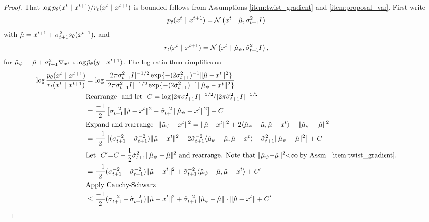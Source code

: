 \begin{proof}
That $\log p_{\theta}(x^{t}~\vert~ x^{t+1})/r_t(x^{t} ~\vert~ x^{t+1})$ is bounded follows from Assumptions \ref{item:twist_gradient} and \ref{item:proposal_var}.
First write
$$
p_{\theta}(x^{t} ~\vert~ x^{t+1}) = \mathcal{N}\left(x^{t} ~\vert~ \hat \mu, \sigma_{t+1}^2 I
\right)$$
with $\hat \mu=x^{t+1} + \sigma_{t+1}^2 s_\theta(x^{t+1}),$
and 
$$
r_t(x^{t} ~\vert~ x^{t+1}) = 
\mathcal{N}\left(
x^{t} ~\vert~  \hat \mu_\psi, \tilde \sigma_{t+1}^2 I \right),
$$
for $\hat \mu_\psi = \hat \mu + \sigma_{t+1}^2 \nabla_{x^{t+1}}\log \tilde p_\theta(y~\vert~ x^{t+1})$.
The log-ratio then simplifies as 
\begin{align}
\log \frac{\pmodel(\xt\mid \xtpo)}{r_t(\xt \mid \xtpo)} &= 
\log \frac{| 2\pi \sigma_{t+1}^2 I|^{-1/2} \exp\{-(2\sigma_{t+1}^2)^{-1}\|\hat \mu - \xt \|^2 \}}
{ | 2\pi \tilde \sigma_{t+1}^2 I|^{-1/2} \exp\{-(2\tilde \sigma_{t+1}^2)^{-1}\|\hat \mu_\psi- \xt \|^2 \}} \\
&\textrm{Rearrange \ and\  let  \ } C=\log | 2\pi \sigma_{t+1}^2 I|^{-1/2} /  | 2\pi \tilde \sigma_{t+1}^2 I|^{-1/2}\\
&= \frac{-1}{2}\left[ 
\sigma_{t+1}^{-2}\|\hat \mu - \xt \|^2    -
\tilde \sigma_{t+1}^{-2}\|\hat \mu_\psi - \xt \|^2 \right]  +C \\
&\textrm{Expand and rearrange \ } \|\hat \mu_\psi - \xt \|^2 = \| \hat \mu  - \xt \|^2 + 2 \langle \hat\mu_\psi - \hat \mu, \hat \mu - \xt  \rangle + \|\hat \mu_\psi - \hat \mu\|^2 \\
&= \frac{-1}{2}\left[ ( \sigma_{t+1}^{-2} - \tilde \sigma_{t+1}^{-2})\|\hat \mu - \xt \|^2  
- 2 \tilde \sigma_{t+1}^{-2}\langle \hat\mu_\psi - \hat \mu, \hat \mu - \xt  \rangle - \tilde \sigma_{t+1}^2 \|\hat \mu_\psi - \hat \mu\|^2 
\right]+ C\\
&\textrm{Let \ } C^\prime {=} C - \frac{1}{2}\tilde \sigma_{t+1}^2 \|\hat \mu_\psi - \hat \mu\|^2 \textrm{\ and rearrange.  Note that $\|\hat \mu_\psi {-} \hat \mu\|^2{<}\infty$ by Assm. \ref{item:twist_gradient}.}\\
&= \frac{-1}{2}(\sigma_{t+1}^{-2} - \tilde \sigma_{t+1}^{-2})\|\hat \mu - \xt \|^2 +
\tilde \sigma_{t+1}^{-2}\langle \hat\mu_\psi - \hat \mu, \hat \mu - \xt  \rangle + C^\prime\\
&\textrm{Apply Cauchy-Schwarz}\\
&\le  \frac{-1}{2} (\sigma_{t+1}^{-2} - \tilde \sigma_{t+1}^{-2})\|\hat \mu - \xt \|^2
+ \tilde \sigma_{t+1}^{-2}\| \hat\mu_\psi - \hat \mu\|\cdot \| \hat \mu - \xt  \| + C^\prime\\

\end{align}
\end{proof}
